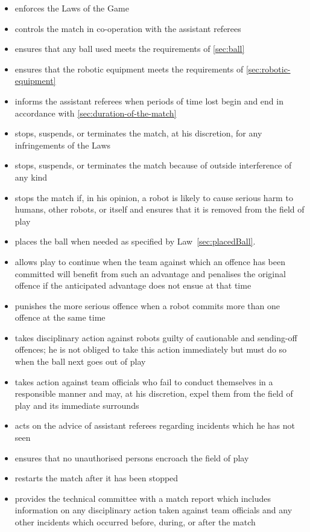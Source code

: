 \begin{itemize}
\item enforces the Laws of the Game
\item controls the match in co-operation with the assistant referees
\item ensures that any ball used meets the requirements of \autoref{sec:ball}
\item ensures that the robotic equipment meets the requirements of \autoref{sec:robotic-equipment}
\item informs the assistant referees when periods of time lost begin and end in accordance with \autoref{sec:duration-of-the-match}
\item stops, suspends, or terminates the match, at his discretion, for any infringements of the Laws
\item stops, suspends, or terminates the match because of outside interference of any kind
\item stops the match if, in his opinion, a robot is likely to cause serious harm to humans, other robots, or itself and ensures that it is removed from the field of play
\item places the ball when needed as specified by Law~\ref{sec:placedBall}.
\item allows play to continue when the team against which an offence has been committed will benefit from such an advantage and penalises the original offence if the anticipated advantage does not ensue at that time
\item punishes the more serious offence when a robot commits more than one offence at the same time
\item takes disciplinary action against robots guilty of cautionable and sending-off offences; he is not obliged to take this action immediately but must do so when the ball next goes out of play
\item takes action against team officials who fail to conduct themselves in a responsible manner and may, at his discretion, expel them from the field of play and its immediate surrounds
\item acts on the advice of assistant referees regarding incidents which he has not seen
\item ensures that no unauthorised persons encroach the field of play
\item restarts the match after it has been stopped
\item provides the technical committee with a match report which includes information on any disciplinary action taken against team officials and any other incidents which occurred before, during, or after the match

\end{itemize}
